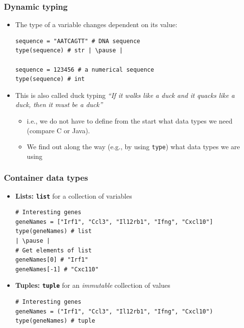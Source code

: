 \documentclass[xcolor=table]{beamer}
\begin{document}
\begin{frame}[fragile]
\frametitle{Dynamic typing}
\begin{itemize}
    \item The type of a variable changes dependent on its value:
\begin{lstlisting}[style=python]
sequence = "AATCAGTT" # DNA sequence 
type(sequence) # str | \pause |

sequence = 123456 # a numerical sequence
type(sequence) # int
\end{lstlisting}
\pause
    \item This is also called duck typing \emph{``If it walks like a duck and it quacks like a duck, then it must be a duck''}
        \begin{itemize}
            \item i.e., we do not have to define from the start what data types we need (compare C or Java). 
            \item We find out along the way (e.g., by using \texttt{type}) what data types we are using
        \end{itemize}
\end{itemize}
\end{frame}

\begin{frame}[fragile]
\frametitle{Container data types}

\begin{itemize}\addtolength{\itemsep}{-0.5\baselineskip}
\item<1-> \textbf{Lists: \texttt{list}} for a collection of variables
\begin{lstlisting}[style=python]
# Interesting genes
geneNames = ["Irf1", "Ccl3", "Il12rb1", "Ifng", "Cxcl10"]
type(geneNames) # list
| \pause |
# Get elements of list
geneNames[0] # "Irf1"
geneNames[-1] # "Cxc110"
\end{lstlisting}

\item<3-> \textbf{Tuples: \texttt{tuple}} for an \emph{immutable} collection of values
\begin{lstlisting}[style=python]
# Interesting genes
geneNames = ("Irf1", "Ccl3", "Il12rb1", "Ifng", "Cxcl10")
type(geneNames) # tuple
\end{lstlisting}
\end{itemize}
\end{frame}
\end{document}

